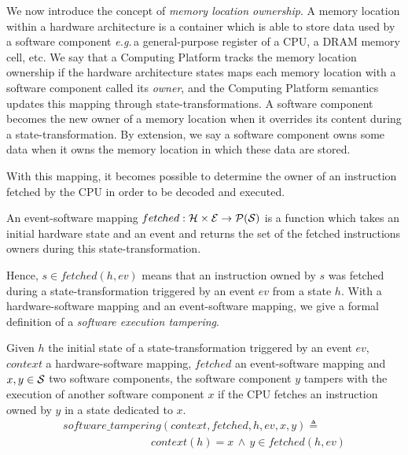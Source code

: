 We now introduce the concept of \textit{memory location ownership}. A memory
location within a hardware architecture is a container which is able to store
data used by a software component \emph{e.g.}\,a general-purpose register of a
CPU, a DRAM memory cell, etc. We say that a Computing Platform tracks the memory
location ownership if the hardware architecture states maps each memory location
with a software component called its \emph{owner}, and the Computing Platform
semantics updates this mapping through state-transformations. A software
component becomes the new owner of a memory location when it overrides its
content during a state-transformation. By extension, we say a software component
owns some data when it owns the memory location in which these data are stored.

With this mapping, it becomes possible to determine the owner of an instruction
fetched by the CPU in order to be decoded and executed.

\begin{definition}
  \label{def:evsoft}
  An event-software mapping
  $fet\-ched: \mathcal{H} \times \mathcal{E} \rightarrow \mathcal{P}(\mathcal{S})$ is a
  function which takes an initial hardware state and an event and returns the
  set of the fetched instructions owners during this state-transformation.
\end{definition}

Hence, $s \in fetched(h, ev)$ means that an instruction owned by $s$ was fetched
during a state-transformation triggered by an event $ev$ from a state $h$. With
a hardware-software mapping and an event-software mapping, we give a formal
definition of a \textit{software execution tampering}.

\begin{definition}
  \label{def:codeinjection}
  Given $h$ the initial state of a state-transformation triggered by an event
  $ev$, $context$ a hardware-software mapping, $fetched$ an event-software
  mapping and $x, y \in \mathcal{S}$ two software components, the software component
  $y$ tampers with the execution of another software component $x$ if the CPU
  fetches an instruction owned by $y$ in a state dedicated to $x$.
  \[ \begin{array}{l} software\_tampering(context, fetched, h, ev, x, y)
       \triangleq \\
       \qquad\qquad\qquad\qquad context(h) = x\,\wedge\,y \in fetched(h,ev)
     \end{array}
   \]
 \end{definition}

